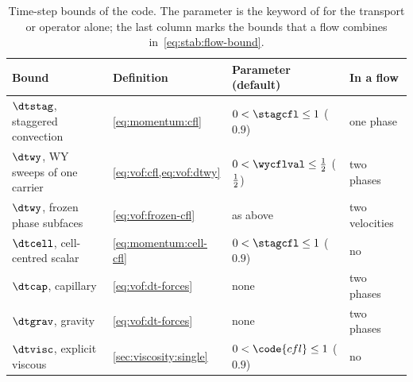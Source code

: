\begin{table}[tbp]
  \centering\small
  \caption{Time-step bounds of the code. The parameter is the 
  keyword of  for the transport or operator alone;
  the last column marks the bounds that a flow combines
  in~\cref{eq:stab:flow-bound}.}\label{tab:stab:bounds}
  \begin{tabular}{@{}llll@{}}
    \toprule
    Bound & Definition & Parameter (default) & In a flow\\
    \midrule
    $\dtstag$, staggered convection & \cref{eq:momentum:cfl} & $0<\stagcfl\le1$ ($0.9$) & one phase\\
    $\dtwy$, WY sweeps of one carrier & \cref{eq:vof:cfl,eq:vof:dtwy} & $0<\wycflval\le\half$ ($\frac{1}{2}$) & two phases\\
    $\dtwy$, frozen phase subfaces & \cref{eq:vof:frozen-cfl} & as above & two velocities\\
    $\dtcell$, cell-centred scalar & \cref{eq:momentum:cell-cfl} & $0<\stagcfl\le1$ ($0.9$) & no\\
    $\dtcap$, capillary & \cref{eq:vof:dt-forces} & none & two phases\\
    $\dtgrav$, gravity & \cref{eq:vof:dt-forces} & none & two phases\\
    $\dtvisc$, explicit viscous & \cref{sec:viscosity:single} & $0<\code{cfl}\le1$ ($0.9$) & no\\
    \bottomrule
  \end{tabular}
\end{table}

